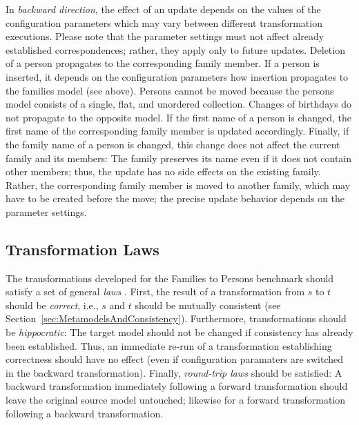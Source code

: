 In \emph{backward direction}, the effect of an update depends on the values of the configuration parameters which may vary between different transformation executions. Please note that the parameter settings must not affect already established correspondences; rather, they apply only to future updates. Deletion of a person propagates to the corresponding family member. If a person is inserted, it depends on the configuration parameters how insertion propagates to the families model (see above). Persons cannot be moved because the persons model consists of a single, flat, and unordered collection. Changes of birthdays do not propagate to the opposite model. If the first name of a person is changed, the first name of the corresponding family member is updated accordingly. Finally, if the family name of a person is changed, this change does not affect the current family and its members: The family preserves its name even if it does not contain other members; thus, the update has no side effects on the existing family. Rather, the corresponding family member is moved to another family, which may have to be created before the move; the precise update behavior depends on the parameter settings.

\subsection{Transformation Laws}
\label{sec:TranformationLaws}


\noindent The transformations developed for the Families to Persons benchmark should satisfy a set of general \emph{laws} \cite{SOSYM-Stevens2010}. First, the result of a transformation from $s$ to $t$ should be \emph{correct}, i.e., $s$ and $t$ should be mutually consistent (see Section~\ref{sec:MetamodelsAndConsistency}). Furthermore, transformations should be \emph{hippocratic}: The target model should not be changed if consistency has already been established. Thus, an immediate re-run of a transformation establishing correctness should have no effect (even if configuration paramaters are switched in the backward transformation). Finally, \emph{round-trip laws} \cite{TOPLAS2007-Foster} should be satisfied: A backward transformation immediately following a forward transformation should leave the original source model untouched; likewise for a forward transformation following a backward transformation.

